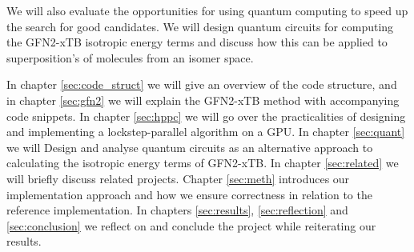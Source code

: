 We will also evaluate the opportunities for using quantum computing to speed up the search for good candidates. We will design quantum circuits for computing the GFN2-xTB isotropic energy terms and discuss how this can be applied to superposition's of molecules from an isomer space. 

In chapter \ref{sec:code_struct} we will give an overview of the code structure, and in chapter \ref{sec:gfn2} we will explain the GFN2-xTB method with accompanying code snippets. In chapter \ref{sec:hppc} we will go over the practicalities of designing and implementing a lockstep-parallel algorithm on a GPU. In chapter \ref{sec:quant} we will Design and analyse quantum circuits as an alternative approach to calculating the isotropic energy terms of GFN2-xTB. In chapter \ref{sec:related} we will briefly discuss related projects. Chapter \ref{sec:meth} introduces our implementation approach and how we ensure correctness in relation to the reference implementation. In chapters \ref{sec:results}, \ref{sec:reflection} and \ref{sec:conclusion} we reflect on and conclude the project while reiterating our results.
